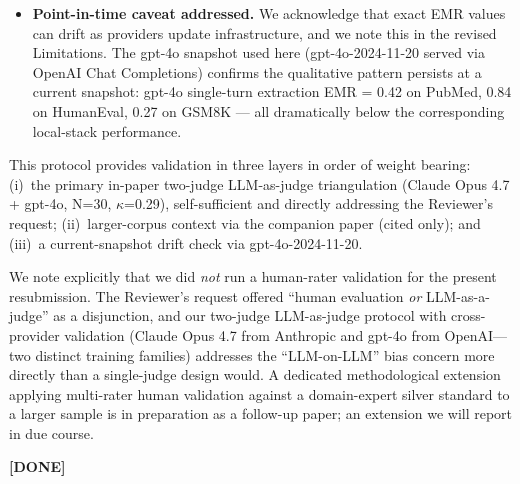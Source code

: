 \documentclass[11pt,a4paper]{article}
\newcommand{\done}{\color{revgreen}\textbf{[DONE]}}
\begin{document}
{\begin{itemize}[leftmargin=*]
  \item \textbf{Point-in-time caveat addressed.} We acknowledge that exact EMR values can drift as providers update infrastructure, and we note this in the revised Limitations. The gpt-4o snapshot used here (gpt-4o-2024-11-20 served via OpenAI Chat Completions) confirms the qualitative pattern persists at a current snapshot: gpt-4o single-turn extraction EMR = 0.42 on PubMed, 0.84 on HumanEval, 0.27 on GSM8K --- all dramatically below the corresponding local-stack performance.
\end{itemize}

This protocol provides validation in three layers in order of weight bearing: (i)~the primary in-paper two-judge LLM-as-judge triangulation (Claude Opus 4.7 + gpt-4o, N=30, $\kappa$=0.29), self-sufficient and directly addressing the Reviewer's request; (ii)~larger-corpus context via the companion paper (cited only); and (iii)~a current-snapshot drift check via gpt-4o-2024-11-20.

We note explicitly that we did \emph{not} run a human-rater validation for the present resubmission. The Reviewer's request offered ``human evaluation \emph{or} LLM-as-a-judge'' as a disjunction, and our two-judge LLM-as-judge protocol with cross-provider validation (Claude Opus 4.7 from Anthropic and gpt-4o from OpenAI---two distinct training families) addresses the ``LLM-on-LLM'' bias concern more directly than a single-judge design would. A dedicated methodological extension applying multi-rater human validation against a domain-expert silver standard to a larger sample is in preparation as a follow-up paper; an extension we will report in due course.} \done
\end{document}
